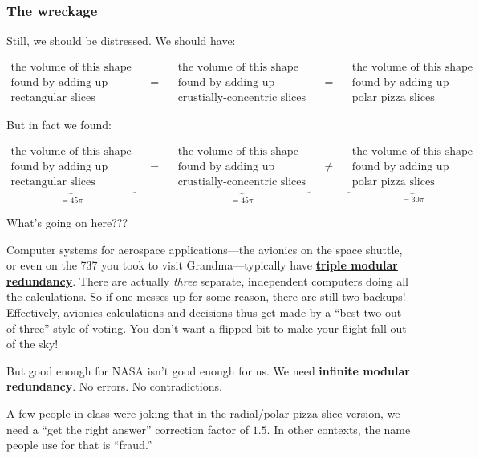 \documentclass[
]{article}
\begin{document}
\hypertarget{the-wreckage}{%
\subsubsection{The wreckage}\label{the-wreckage}}

Still, we should be distressed. We should have:

\[\substack{\text{the volume of this shape}\\\text{found by adding up}\\\text{rectangular slices}} \quad=\quad \substack{\text{the volume of this shape}\\\text{found by adding up}\\\text{crustially-concentric slices}} \quad=\quad \substack{\text{the volume of this shape}\\\text{found by adding up}\\\text{polar pizza slices}} \]

But in fact we found:

\[\underbrace{\substack{\text{the volume of this shape}\\\text{found by adding up}\\\text{rectangular slices}}}_{=45\pi} \quad=\quad \underbrace{\substack{\text{the volume of this shape}\\\text{found by adding up}\\\text{crustially-concentric slices}}}_{=45\pi} \quad\neq\quad \underbrace{\substack{\text{the volume of this shape}\\\text{found by adding up}\\\text{polar pizza slices}}}_{=30\pi} \]

What's going on here???

Computer systems for aerospace applications---the avionics on the space shuttle, or even on the 737 you took to visit Grandma---typically have \textbf{\href{https://en.wikipedia.org/wiki/Triple_modular_redundancy}{triple modular redundancy}}. There are actually \emph{three} separate, independent computers doing all the calculations. So if one messes up for some reason, there are still two backups! Effectively, avionics calculations and decisions thus get made by a ``best two out of three'' style of voting. You don't want a flipped bit to make your flight fall out of the sky!

But good enough for NASA isn't good enough for us. We need \textbf{infinite modular redundancy}. No errors. No contradictions.

A few people in class were joking that in the radial/polar pizza slice version, we need a ``get the right answer'' correction factor of \(1.5\). In other contexts, the name people use for that is ``fraud.''
\end{document}
